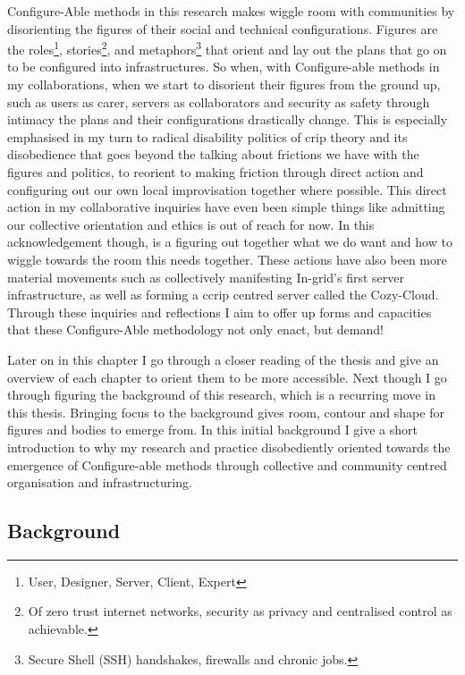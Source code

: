 Configure-Able methods in this research makes wiggle room with
communities by disorienting the figures of their social and technical
configurations. Figures are the roles\footnote{User, Designer, Server,
  Client, Expert}, stories\footnote{Of zero trust internet networks,
  security as privacy and centralised control as achievable.}, and
metaphors\footnote{Secure Shell (SSH) handshakes, firewalls and chronic
  jobs.} that orient and lay out the plans that go on to be configured
into infrastructures. So when, with Configure-able methods in my
collaborations, when we start to disorient their figures from the ground
up, such as users as carer, servers as collaborators and security as
safety through intimacy the plans and their configurations drastically
change. This is especially emphasised in my turn to radical disability
politics of crip theory and its disobedience that goes beyond the
talking about frictions we have with the figures and politics, to
reorient to making friction through direct action and configuring out
our own local improvisation together where possible. This direct action
in my collaborative inquiries have even been simple things like
admitting our collective orientation and ethics is out of reach for now.
In this acknowledgement though, is a figuring out together what we do
want and how to wiggle towards the room this needs together. These
actions have also been more material movements such as collectively
manifesting In-grid's first server infrastructure, as well as forming a
ccrip centred server called the Cozy-Cloud. Through these inquiries and
reflections I aim to offer up forms and capacities that these
Configure-Able methodology not only enact, but demand!

Later on in this chapter I go through a closer reading of the thesis and
give an overview of each chapter to orient them to be more accessible.
Next though I go through figuring the background of this research, which
is a recurring move in this thesis. Bringing focus to the background
gives room, contour and shape for figures and bodies to emerge from. In
this initial background I give a short introduction to why my research
and practice disobediently oriented towards the emergence of
Configure-able methods through collective and community centred
organisation and infrastructuring.

\hypertarget{background}{%
\subsection[Background]{\texorpdfstring{\protect\hypertarget{anchor}{}{}Background}{Background}}\label{background}}

